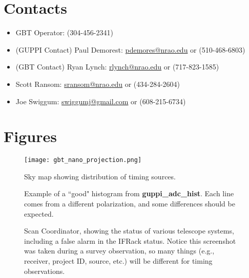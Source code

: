 \documentclass[11pt, reqno, tbtags]{article}
\begin{document}
\section{Contacts}\label{sec:con}  %
\begin{itemize}
 \item GBT Operator: (304-456-2341)
 \item (GUPPI Contact) Paul Demorest: \href{mailto:pdemores@nrao.edu}{pdemores@nrao.edu} or (510-468-6803)
 \item (GBT Contact) Ryan Lynch: \href{mailto:rlynch@nrao.edu}{rlynch@nrao.edu} or (717-823-1585)
 \item Scott Ransom: \href{mailto:sransom@nrao.edu}{sransom@nrao.edu} or (434-284-2604)
 \item Joe Swiggum: \href{mailto:swiggumj@gmail.com}{swiggumj@gmail.com} or (608-215-6734)
\end{itemize}



\newpage
\section{Figures}  %
\vspace{2cm}

\begin{figure}[h]
 \centering
  \texttt{[image: gbt\_nano\_projection.png]}
  \caption{Sky map showing distribution of timing sources.}
  \label{fig:map}
\end{figure}
\newpage

\begin{figure}[h!]
 \centering
  \caption{Example of a ``good" histogram from \textbf{guppi\_adc\_hist}.  Each line comes from a different polarization, and some differences should be expected.}  
  \label{fig:gah}
\end{figure}
\vspace{1cm}

\begin{figure}[h!]
 \centering
  \caption{Scan Coordinator, showing the status of various telescope systems, including a false alarm in the IFRack status. Notice this screenshot was taken during a survey observation, so many things (e.g., receiver, project ID, source, etc.) will be different for timing observations.  }
  \label{fig:sc}
\end{figure}
\newpage
\end{document}

